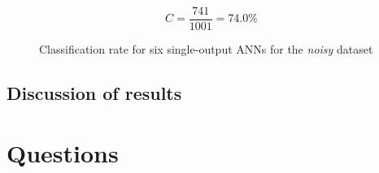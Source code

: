 \documentclass[a4paper]{article}
\begin{document}
\begin{figure}[H]
\[ C = \frac{741}{1001} = 74.0\% \]
\caption{Classification rate for six single-output ANNs for the \emph{noisy} dataset}
\end{figure}

\subsection{Discussion of results}

\clearpage


\section{Questions}
\end{document}
